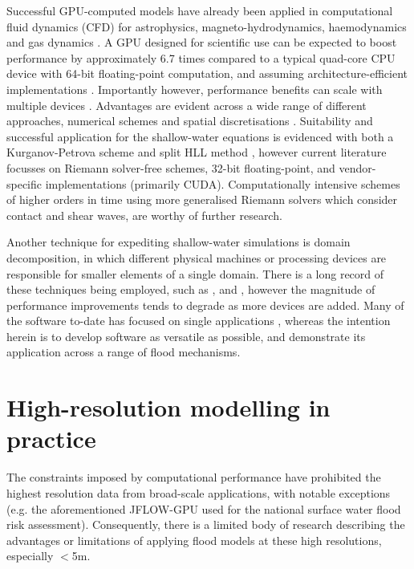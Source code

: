Successful GPU-computed models have already been applied in computational fluid dynamics (CFD) for astrophysics, magneto-hydrodynamics, haemodynamics and gas dynamics \citep[e.g.][]{Bisson2012}. A GPU designed for scientific use can be expected to boost performance by approximately 6.7 times compared to a typical quad-core CPU device with 64-bit floating-point computation, and assuming architecture-efficient implementations \citep{IntelCorporation2012,NVIDIACorporation2011}. Importantly however, performance benefits can scale with multiple devices \citep{Kuo2011,Saetra2012}. Advantages are evident across a wide range of different approaches, numerical schemes and spatial discretisations \citep[e.g.][]{Kuo2011,Horvath2010,Wang2010,Rossinelli2011,Schive2011,Crespo2011}. Suitability and successful application for the shallow-water equations is evidenced with both a Kurganov-Petrova scheme and split HLL method \citep{Brodtkorb2010,Brodtkorb2010a,Brodtkorb2011,Saetra2012,Kuo2011}, however current literature focusses on Riemann solver-free schemes, 32-bit floating-point, and vendor-specific implementations (primarily CUDA). Computationally intensive schemes of higher orders in time using more generalised Riemann solvers which consider contact and shear waves, are worthy of further research.

Another technique for expediting shallow-water simulations is domain decomposition, in which different physical machines or processing devices are responsible for smaller elements of a single domain. There is a long record of these techniques being employed, such as \citet{Rao2004}, \citet{Neal2010} and \citet{Asuncion2016}, however the magnitude of performance improvements tends to degrade as more devices are added. Many of the software to-date has focused on single applications \citep[e.g.][for tsunami]{Asuncion2016}, whereas the intention herein is to develop software as versatile as possible, and demonstrate its application across a range of flood mechanisms.

\section{High-resolution modelling in practice}

The constraints imposed by computational performance have prohibited the highest resolution data from broad-scale applications, with notable exceptions (e.g. the aforementioned JFLOW-GPU used for the national surface water flood risk assessment). Consequently, there is a limited body of research describing the advantages or limitations of applying flood models at these high resolutions, especially $<$5m.

